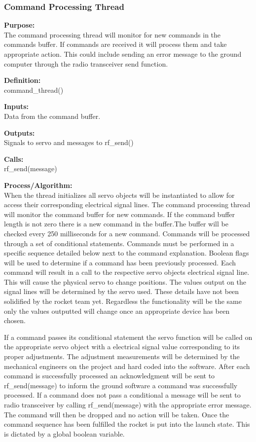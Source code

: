 \documentclass[10pt,draftclsnofoot,onecolumn,compsoc]{IEEEtran}
\begin{document}
\subsubsection{Command Processing Thread}
{\bf Purpose:} \\
The command processing thread will monitor for new commands in the commands buffer. If commands are received it will process them and take appropriate action. This could include sending an error message to the ground computer through the radio transceiver send function. \par
{\bf Definition:} \\ 
command\_thread() \par
{\bf Inputs:} \\  Data from the command buffer. \par
{\bf Outputs:} \\ Signals to servo and messages to rf\_send() \par
{\bf Calls:} \\ 
rf\_send(message)  \par
{\bf Process/Algorithm:} \\
When the thread initializes all servo objects will be instantiated to allow for access their corresponding electrical signal lines. The command processing thread will monitor the command buffer for new commands. If the command buffer length is not zero there is a new command in the buffer.The buffer will be checked  every 250 milliseconds for a new command. Commands will be processed through a set of conditional statements. Commands must be performed in a specific sequence detailed below next to the command explanation. Boolean flags will be used to determine if a command has been previously processed.  Each command will result in a call to the respective servo objects electrical signal line. This will cause the physical servo to change positions. The values output on the signal lines will be determined by the servo used. These details have not been solidified by the rocket team yet. Regardless the functionality will be the same only the values outputted will change once an appropriate device has been chosen. \par
If a command passes its conditional statement the servo function will be called on the appropriate servo object with a electrical signal value corresponding to its proper adjustments. The adjustment measurements will be determined by the mechanical engineers on the project and hard coded into the software. After each command is successfully processed an acknowledgment will be sent to rf\_send(message) to inform the ground software a command was successfully processed. If a command does not pass a conditional a message will be sent to radio transceiver by calling rf\_send(message) with the appropriate error message. The command will then be dropped and no action will be taken. Once the command sequence has been fulfilled the rocket is put into the launch state. This is dictated by a global boolean variable.\par
\end{document}
